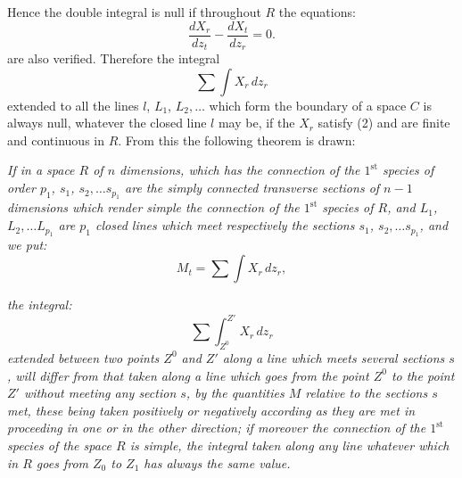 \documentclass{article}
\begin{document}
Hence the double integral is null if throughout $R$ the equations:
\[ \frac{dX_{r}}{dz_{t}} - \frac{dX_{t}}{dz_{r}} = 0. \tag{2} \]
are also verified. Therefore the integral
\[ \sum \int X_{r}\,dz_{r} \]
extended to all the lines $l$, $L_{1}$, $L_{2},\ldots$ which form the boundary of a space $C$ is always null, whatever the closed line $l$ may be, if the $X_{r}$ satisfy (2) and are finite and continuous in $R$. From this the following theorem is drawn:

\emph{If in a space $R$ of $n$ dimensions, which has the connection of the $1^{\text{st}}$ species of order $p_{1}$, $s_{1}$, $s_{2},\ldots s_{p_{1}}$ are the simply connected transverse sections of $n-1$ dimensions which render simple the connection of the $1^{\text{st}}$ species of $R$, and $L_{1}$, $L_{2},\ldots L_{p_{1}}$ are $p_{1}$ closed lines which meet respectively the sections $s_{1}$, $s_{2},\ldots s_{p_{1}}$, and we put:}
\[ M_{t} = \sum \int X_{r}\,dz_{r}, \]

\emph{the integral:}
\[ \sum \int_{Z^{0}}^{Z'} X_{r}\,dz_{r} \]
\emph{extended between two points $Z^{0}$ and $Z'$ along a line which meets several sections $s$, will differ from that taken along a line which goes from the point $Z^{0}$ to the point $Z'$ without meeting any section $s$, by the quantities $M$ relative to the sections $s$ met, these being taken positively or negatively according as they are met in proceeding in one or in the other direction; if moreover the connection of the $1^{\text{st}}$ species of the space $R$ is simple, the integral taken along any line whatever which in $R$ goes from $Z_{0}$ to $Z_{1}$ has always the same value.}
\end{document}
